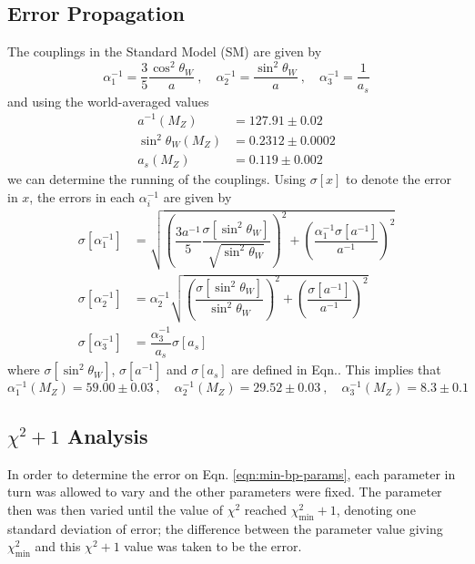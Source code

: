 \documentclass[12pt,a4paper,oneside]{article}
\begin{document}
\subsection{Error Propagation}
The couplings in the Standard Model (SM) are given by
\begin{equation}
\alpha_1^{-1} = \dfrac{3}{5} \dfrac{\cos^2 \theta_W}{a} \:, \quad
\alpha_2^{-1} = \dfrac{\sin^2 \theta_W}{a} \:, \quad
\alpha_3^{-1} = \dfrac{1}{a_s}
\label{eqn:coupling}
\end{equation}
and using the world-averaged values
\begin{align}
a^{-1} (M_Z) &= 127.91 \pm 0.02 \nonumber \\
\sin^2 \theta_W (M_Z) &= 0.2312 \pm 0.0002 \\%
a_s (M_Z) &= 0.119 \pm 0.002 \nonumber
\end{align}
we can determine the running of the couplings. Using $\sigma[x]$ to denote the error in $x$, the errors in each $\alpha_i^{-1}$ are given by
\begin{align}
\sigma[\alpha_1^{-1}] &= \sqrt{\left(\dfrac{3 a^{-1}}{5} \dfrac{\sigma[\sin^2 \theta_W]}{\sqrt{\sin^2 \theta_W}} \right)^2 + \left( \dfrac{\alpha_1^{-1} \sigma[a^{-1}]}{a^{-1}} \right)^2 } \nonumber \\
\sigma[\alpha_2^{-1}] &= \alpha_2^{-1} \sqrt{ \left( \dfrac{\sigma[\sin^2 \theta_W]}{\sin^2 \theta_W} \right)^2 + \left( \dfrac{\sigma[a^{-1}]}{a^{-1}} \right)^2 } \label{eqn:error} \\
\sigma[\alpha_3^{-1}] &= \dfrac{\alpha_3^{-1}}{a_s} \sigma[a_s] \nonumber
\end{align}
where $\sigma[\sin^2 \theta_W]$, $\sigma[a^{-1}]$ and $\sigma[a_s]$ are defined in Eqn.. This implies that
\begin{equation}
\alpha_1^{-1} (M_Z) = 59.00 \pm 0.03 \:, \quad
\alpha_2^{-1} (M_Z) =  29.52 \pm 0.03 \:, \quad
\alpha_3^{-1} (M_Z) =  8.3 \pm 0.1
\label{eqn:couplingvals-a}
\end{equation}

\subsection{$\chi^2 + 1$ Analysis}
In order to determine the error on Eqn. \ref{eqn:min-bp-params}, each parameter in turn was allowed to vary and the other parameters were fixed. The parameter then was then varied until the value of $\chi^2$ reached $\chi^2_\mathrm{min} + 1$, denoting one standard deviation of error; the difference between the parameter value giving $\chi^2_\mathrm{min}$ and this $\chi^2 + 1$ value was taken to be the error.
\end{document}
